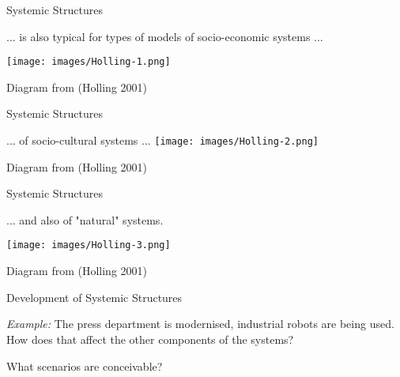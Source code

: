 \documentclass{beamer}
\begin{document}
\begin{frame}{Systemic Structures}

  ... is also typical for types of models of socio-economic systems ...
  \begin{center}
    \texttt{[image: images/Holling-1.png]}

    Diagram from (Holling 2001)
  \end{center}
\end{frame}

\begin{frame}{Systemic Structures}
  \begin{center}

    ... of socio-cultural systems ... 
    \texttt{[image: images/Holling-2.png]}

    Diagram from (Holling 2001)
  \end{center}
\end{frame}

\begin{frame}{Systemic Structures}

  ... and also of "natural" systems.
  \begin{center}
    \texttt{[image: images/Holling-3.png]}

    Diagram from (Holling 2001)
  \end{center}
\end{frame}

\begin{frame}{Development of Systemic Structures}

  \emph{Example:} The press department is modernised, industrial robots are
  being used.  How does that affect the other components of the systems?

  What scenarios are conceivable?

\end{frame}
\end{document}
